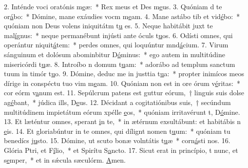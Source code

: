 2. Inténde voci oratónis m\uline{e}æ:~* Rex meus et Des m\uline{e}us.
3. Quóniam d te or\uline{á}bo:~* Dómine, mane exáudies vocm m\uline{e}am.
4. Mane astábo tib et vid\uline{é}bo:~* quóniam non Deus volens iniquitátm t\uline{u} es.
5. Neque habitábit juxt te mal\uline{í}gnus:~* neque permanébunt injústi ante óculs t\uline{u}os.
6. Odísti omnes, qui operántur niquit\uline{á}tem:~* perdes omnes, qui loquúntur mnd\uline{á}cium.
7. Virum sánguinum et dolósum abominbitur D\uline{ó}minus:~* ego autem in multitúdine misericórdi t\uline{u}æ.
8. Introíbo n domum t\uline{u}am:~* adorábo ad templum sanctum tuum in timór t\uline{u}o.
9. Dómine, deduc me in justtia t\uline{u}a:~* propter inimícos meos dírige in conspéctu tuo vim m\uline{e}am.
10. Quóniam non est in ore órum v\uline{é}ritas:~* cor eórm v\uline{a}num est.
11. Sepúlcrum patens est guttur eórum,~† linguis suis dolse ag\uline{é}bant,~* júdica ills, D\uline{e}us.
12. Décidant a cogitatiónibus suis,~† secúndum multitúdinem impietátum eórum xpélle \uline{e}os,~* quóniam irritavérunt t, D\uline{ó}mine.
13. Et læténtur omnes,  sperant \uline{i}n te,~* in ætérnum exsultábunt: et habitábis n \uline{e}is.
14. Et gloriabúntur in te omnes, qui dílignt nomen t\uline{u}um:~* quóniam tu benedícs j\uline{u}sto.
15. Dómine, ut scuto bonæ volntátis t\uline{u}æ~* corn\uline{á}sti nos.
16. Glória Ptri, et F\uline{í}lio,~* et Spirítu S\uline{a}ncto.
17. Sicut erat in princípio, t nunc, et s\uline{e}mper,~* et in sǽcula sæculórm. \uline{A}men.
